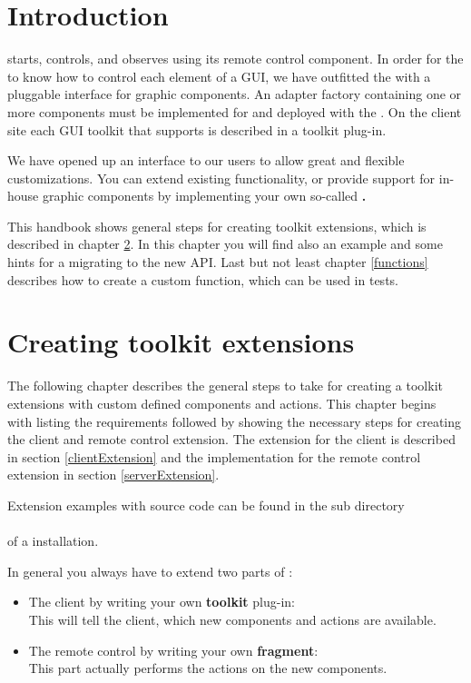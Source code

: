 \chapter{Introduction}
\label{introduction}

\app{} starts, controls, and observes \gdauts using its remote control component. In
order for the \gdagent to know how to control each element of a GUI, we have
outfitted the \gdagent with a pluggable interface for graphic components. An
adapter factory containing one or more components must be implemented for and
deployed with the \gdaut. On the client site each GUI toolkit that \app{}
supports is described in a toolkit plug-in.

We have opened up an interface to our users to allow great and flexible
customizations. You can extend existing functionality, or provide support for
in-house graphic components by implementing your own so-called
\textbf{\gdtesterclasses.}

This handbook shows general steps for creating \app{} toolkit extensions, which
is described in chapter \ref{toolkitExtension}. In this chapter you will find
also an example and some hints for a migrating to the new API. Last but not
least chapter \ref{functions} describes how to create a custom \app{} function,
which can be used in \app{} tests.

\chapter{Creating \app{} toolkit extensions}
\label{toolkitExtension}

The following chapter describes the general steps to take for creating a \app{}
toolkit extensions with custom defined components and actions. This chapter
begins with listing the requirements followed by showing the necessary steps
for creating the \app{} client and remote control extension. The extension for
the \app{} client is described in section \ref{clientExtension} and the
implementation for the \app{} remote control extension in section
\ref{serverExtension}.

Extension examples with source code can be found in the sub directory\\
\\
of a \app{} installation.

In general you always have to extend two parts of \app{}:
\begin{itemize}
\item The \app{} client by writing your own \textbf{toolkit} plug-in:\\
      This will tell the client, which new components and actions are available.
\item The \app{} remote control by writing your own \textbf{fragment}:\\
      This part actually performs the actions on the new components.
\end{itemize}

